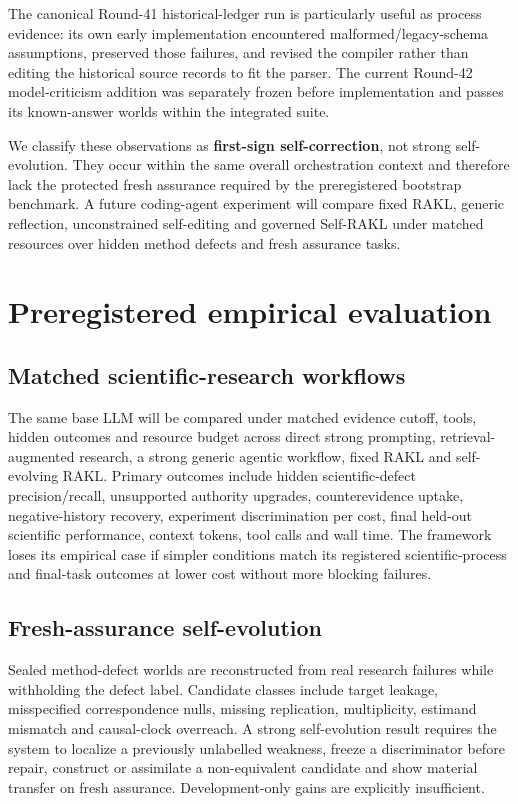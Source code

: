 \documentclass[11pt]{article}
\newcommand{\RAKL}{\textsc{RAKL}}
\begin{document}
The canonical Round-41 historical-ledger run is particularly useful as process evidence: its own early implementation encountered malformed/legacy-schema assumptions, preserved those failures, and revised the compiler rather than editing the historical source records to fit the parser. The current Round-42 model-criticism addition was separately frozen before implementation and passes its known-answer worlds within the integrated suite.

We classify these observations as \textbf{first-sign self-correction}, not strong self-evolution. They occur within the same overall orchestration context and therefore lack the protected fresh assurance required by the preregistered bootstrap benchmark. A future coding-agent experiment will compare fixed \RAKL{}, generic reflection, unconstrained self-editing and governed Self-\RAKL{} under matched resources over hidden method defects and fresh assurance tasks.

\section{Preregistered empirical evaluation}
\subsection{Matched scientific-research workflows}
The same base LLM will be compared under matched evidence cutoff, tools, hidden outcomes and resource budget across direct strong prompting, retrieval-augmented research, a strong generic agentic workflow, fixed \RAKL{} and self-evolving \RAKL{}. Primary outcomes include hidden scientific-defect precision/recall, unsupported authority upgrades, counterevidence uptake, negative-history recovery, experiment discrimination per cost, final held-out scientific performance, context tokens, tool calls and wall time. The framework loses its empirical case if simpler conditions match its registered scientific-process and final-task outcomes at lower cost without more blocking failures.

\subsection{Fresh-assurance self-evolution}
Sealed method-defect worlds are reconstructed from real research failures while withholding the defect label. Candidate classes include target leakage, misspecified correspondence nulls, missing replication, multiplicity, estimand mismatch and causal-clock overreach. A strong self-evolution result requires the system to localize a previously unlabelled weakness, freeze a discriminator before repair, construct or assimilate a non-equivalent candidate and show material transfer on fresh assurance. Development-only gains are explicitly insufficient.
\end{document}
